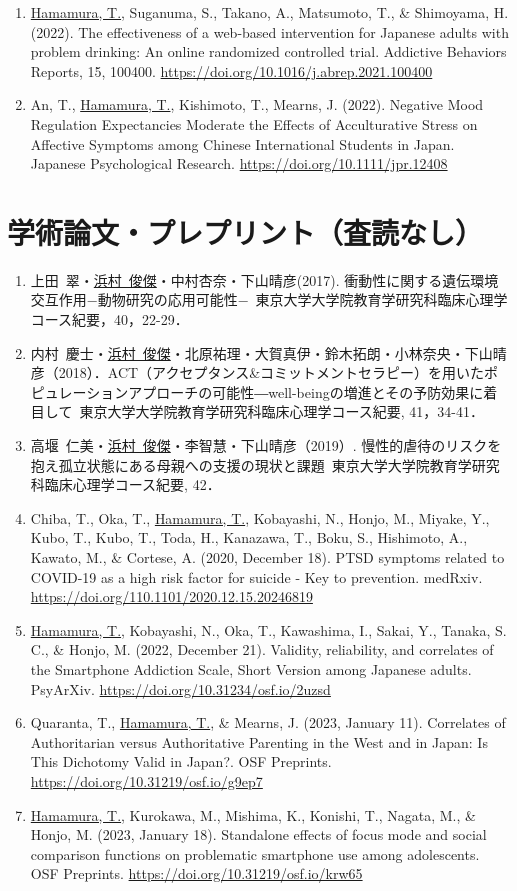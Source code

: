 \documentclass[11pt,a4paper]{article}
\begin{document}
\begin{enumerate}
	\item \underline{Hamamura, T.}, Suganuma, S., Takano, A., Matsumoto, T., \& Shimoyama, H. (2022). The effectiveness of a web-based intervention for Japanese adults with problem drinking: An online randomized controlled trial. Addictive Behaviors Reports, 15, 100400. \url{https://doi.org/10.1016/j.abrep.2021.100400}
	\item An, T., \underline{Hamamura, T.}, Kishimoto, T., Mearns, J. (2022). Negative Mood Regulation Expectancies Moderate the Effects of Acculturative Stress on Affective Symptoms among Chinese International Students in Japan. Japanese Psychological Research. \url{https://doi.org/10.1111/jpr.12408}
\end{enumerate}

\section{学術論文・プレプリント（査読なし）}
\begin{enumerate}
	\item 上田\ 翠・\underline{浜村\ 俊傑}・中村杏奈・下山晴彦(2017). 衝動性に関する遺伝環境交互作用−動物研究の応用可能性−\ 東京大学大学院教育学研究科臨床心理学コース紀要，40，22-29．
	\item 内村\ 慶士・\underline{浜村\ 俊傑}・北原祐理・大賀真伊・鈴木拓朗・小林奈央・下山晴彦（2018）．ACT（アクセプタンス\&コミットメントセラピー）を用いたポピュレーションアプローチの可能性―well-beingの増進とその予防効果に着目して\ 東京大学大学院教育学研究科臨床心理学コース紀要, 41，34-41．
	\item 高堰\ 仁美・\underline{浜村\ 俊傑}・李智慧・下山晴彦（2019）. 慢性的虐待のリスクを抱え孤立状態にある母親への支援の現状と課題\ 東京大学大学院教育学研究科臨床心理学コース紀要, 42．
	\item Chiba, T., Oka, T., \underline{Hamamura, T.}, Kobayashi, N., Honjo, M., Miyake, Y., Kubo, T., Kubo, T., Toda, H., Kanazawa, T., Boku, S., Hishimoto, A., Kawato, M., \& Cortese, A. (2020, December 18). PTSD symptoms related to COVID-19 as a high risk factor for suicide - Key to prevention. medRxiv. \url{https://doi.org/110.1101/2020.12.15.20246819}
	\item \underline{Hamamura, T.}, Kobayashi, N., Oka, T., Kawashima, I., Sakai, Y., Tanaka, S. C., \& Honjo, M. (2022, December 21). Validity, reliability, and correlates of the Smartphone Addiction Scale, Short Version among Japanese adults. PsyArXiv. \url{https://doi.org/10.31234/osf.io/2uzsd}
	\item Quaranta, T., \underline{Hamamura, T.}, \& Mearns, J. (2023, January 11). Correlates of Authoritarian versus Authoritative Parenting in the West and in Japan: Is This Dichotomy Valid in Japan?. OSF Preprints. \url{https://doi.org/10.31219/osf.io/g9ep7}
	\item \underline{Hamamura, T.}, Kurokawa, M., Mishima, K., Konishi, T., Nagata, M., \& Honjo, M. (2023, January 18). Standalone effects of focus mode and social comparison functions on problematic smartphone use among adolescents. OSF Preprints. \url{https://doi.org/10.31219/osf.io/krw65}	
\end{enumerate}
\end{document}
